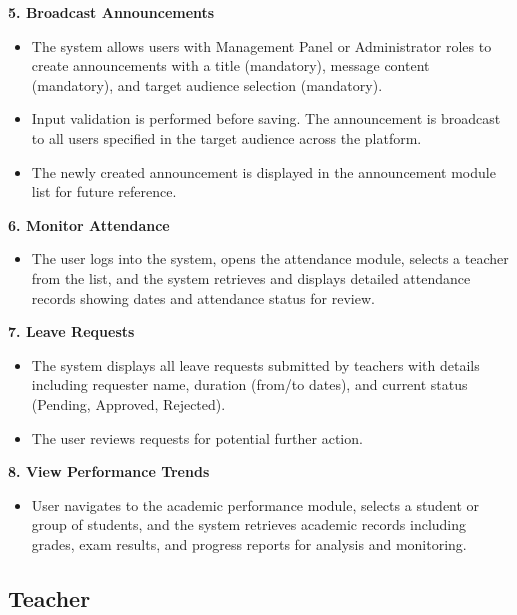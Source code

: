 \documentclass[12pt, a4paper]{report}
\begin{document}
\textbf{5. Broadcast Announcements}
\begin{itemize}
    \item The system allows users with Management Panel or Administrator roles to create announcements with a title (mandatory), message content (mandatory), and target audience selection (mandatory).
    \item Input validation is performed before saving. The announcement is broadcast to all users specified in the target audience across the platform.
    \item The newly created announcement is displayed in the announcement module list for future reference.
\end{itemize}

\textbf{6. Monitor Attendance}
\begin{itemize}
    \item The user logs into the system, opens the attendance module, selects a teacher from the list, and the system retrieves and displays detailed attendance records showing dates and attendance status for review.
\end{itemize}

\textbf{7. Leave Requests}
\begin{itemize}
    \item The system displays all leave requests submitted by teachers with details including requester name, duration (from/to dates), and current status (Pending, Approved, Rejected).
    \item The user reviews requests for potential further action.
\end{itemize}

\textbf{8. View Performance Trends}
\begin{itemize}
    \item User navigates to the academic performance module, selects a student or group of students, and the system retrieves academic records including grades, exam results, and progress reports for analysis and monitoring.
\end{itemize}

\subsection{Teacher}
\end{document}
